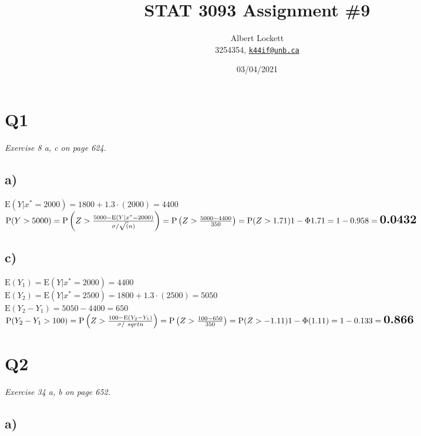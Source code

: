 \documentclass[a4paper,11pt]{article}
\begin{document}
\title{STAT 3093 Assignment \#9}
\author{
  Albert Lockett \\ 
  3254354, 
  \href{mailto:k44if@unb.ca}{\texttt{k44if@unb.ca}}
  }
\date{03/04/2021}

\section*{Q1}
\textit{Exercise 8 a, c on page 624.}

\subsection*{a)}

$\text{E}(Y | x^*=2000) = 1800 + 1.3 \cdot (2000) = 4400$\\

$\text{P}(Y > 5000) = 
\text{P}\left(Z > \frac{5000 - \text{E}(Y|x^*=2000)}{\sigma / \sqrt(n)}\right) =
\text{P}\left(Z > \frac{5000 - 4400}{350}\right) =
\text{P}(Z > 1.71) \\ \\ 
1 - \Phi{1.71} = 
1-0.958 =
\Large{\textbf{0.0432}}
$

\subsection*{c)}

$\text{E}(Y_1) = \text{E}(Y|x^*=2000) = 4400$\\

$\text{E}(Y_2) = \text{E}(Y|x^*=2500) = 1800 + 1.3 \cdot (2500) = 5050$\\

$\text{E}(Y_2 - Y_1) = 5050 - 4400 = 650$\\

$\text{P}(Y_2 - Y_1 > 100) = 
\text{P}\left(Z > \frac{100 - \text{E}(Y_2 - Y_1)}{\sigma / \ sqrt{n}} \right)= 
\text{P}\left(Z > \frac{100 - 650}{350}\right) = 
\text{P}(Z > -1.11) \\ \\ 
1 - \Phi(1.11) = 1 - 0.133 = \Large{\textbf{0.866}}
$

\pagebreak


\section*{Q2}
\textit{Exercise 34 a, b on page 652. }


\subsection*{a)}
\end{document}
